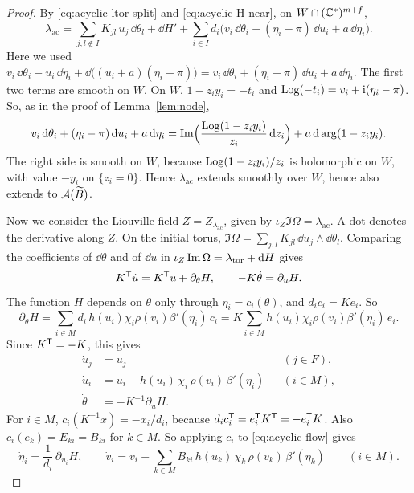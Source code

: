 \documentclass[12pt, letter]{amsart}
\theoremstyle{definition}
\begin{document}
\begin{proof}
By \eqref{eq:acyclic-ltor-split} and \eqref{eq:acyclic-H-near}, on $W\cap(\mathbb{C}^*)^{m+f}$,
\[
 \lambda_{\mathrm{ac}}=\sum_{j,l\notin I}K_{jl}\,u_j\,\dd\theta_l+\dd H'+\sum_{i\in I}d_i\bigl(v_i\,\dd\theta_i+(\eta_i-\pi)\,\dd u_i+a\,\dd\eta_i\bigr).
\]
Here we used $v_i\,\dd\theta_i-u_i\,\dd\eta_i+\dd\bigl((u_i+a)(\eta_i-\pi)\bigr)=v_i\,\dd\theta_i+(\eta_i-\pi)\,\dd u_i+a\,\dd\eta_i$.
The first two terms are smooth on $W$.
On $W$, $1-z_iy_i=-t_i$ and $\operatorname{Log}(-t_i)=v_i+\mathrm i(\eta_i-\pi)$.
So, as in the proof of Lemma~\ref{lem:node},
\[
 v_i\,\mathrm{d}\theta_i+(\eta_i-\pi)\,\mathrm{d} u_i+a\,\mathrm{d}\eta_i
 =\operatorname{Im}\Bigl(\frac{\operatorname{Log}(1-z_iy_i)}{z_i}\,\mathrm{d} z_i\Bigr)+a\,\mathrm{d}\arg(1-z_iy_i).
\]
The right side is smooth on $W$, because $\operatorname{Log}(1-z_iy_i)/z_i$ is holomorphic on $W$, with value $-y_i$ on $\{z_i=0\}$.
Hence $\lambda_{\mathrm{ac}}$ extends smoothly over $W$,  hence also extends to $\mathcal{A}(\widetilde B)$.


Now we consider the Liouville field $Z=Z_{\lambda_{\mathrm{ac}}}$, given by $\iota_Z\Im\Omega=\lambda_{\mathrm{ac}}$.
A dot denotes the derivative along $Z$.
On the initial torus, $\Im\Omega=\sum_{j,l}K_{jl}\,\dd u_j\wedge\dd\theta_l$.
Comparing the coefficients of $\dd\theta$ and of $\dd u$ in $\iota_Z\operatorname{Im}\Omega=\lambda_{\mathrm{tor}}+\mathrm{d} H$ gives
\[
 K^{\mathsf T}\dot u=K^{\mathsf T}u+\partial_\theta H,\qquad -K\dot\theta=\partial_uH .
\]
The function $H$ depends on $\theta$ only through $\eta_i=c_i(\theta)$, and $d_ic_i=Ke_i$.
So
\[
 \partial_\theta H=\sum_{i\in M}d_i\,h(u_i)\chi_i\rho(v_i)\beta'(\eta_i)\,c_i
 =K\sum_{i\in M}h(u_i)\chi_i\rho(v_i)\beta'(\eta_i)\,e_i .
\]
Since $K^{\mathsf T}=-K$, this gives
\begin{equation}\label{eq:acyclic-flow}
 \begin{aligned}
 \dot u_j&=u_j &&(j\in F),\\
 \dot u_i&=u_i-h(u_i)\,\chi_i\,\rho(v_i)\,\beta'(\eta_i) &&(i\in M),\\
 \dot\theta&=-K^{-1}\partial_uH .
 \end{aligned}
\end{equation}
For $i\in M$, $c_i(K^{-1}x)=-x_i/d_i$, because $d_ic_i^{\mathsf T}=e_i^{\mathsf T}K^{\mathsf T}=-e_i^{\mathsf T}K$.
Also $c_i(e_k)=E_{ki}=B_{ki}$ for $k\in M$.
So applying $c_i$ to \eqref{eq:acyclic-flow} gives
\begin{equation}\label{eq:acyclic-angle-flow}
 \dot\eta_i=\frac1{d_i}\,\partial_{u_i}H,\qquad
 \dot v_i=v_i-\sum_{k\in M}B_{ki}\,h(u_k)\,\chi_k\,\rho(v_k)\,\beta'(\eta_k)\qquad(i\in M).
\end{equation}


\end{proof}
\end{document}

